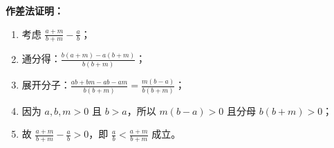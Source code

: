 \begin{proofbox}
\textbf{作差法证明：}
\begin{enumerate}
    \item 考虑 $\frac{a+m}{b+m} - \frac{a}{b}$；
    \item 通分得：$\frac{b(a+m) - a(b+m)}{b(b+m)}$；
    \item 展开分子：$\frac{ab + bm - ab - am}{b(b+m)} = \frac{m(b-a)}{b(b+m)}$；
    \item 因为 $a, b, m > 0$ 且 $b > a$，所以 $m(b-a) > 0$ 且分母 $b(b+m) > 0$；
    \item 故 $\frac{a+m}{b+m} - \frac{a}{b} > 0$，即 $\frac{a}{b} < \frac{a+m}{b+m}$ 成立。
\end{enumerate}
\end{proofbox}